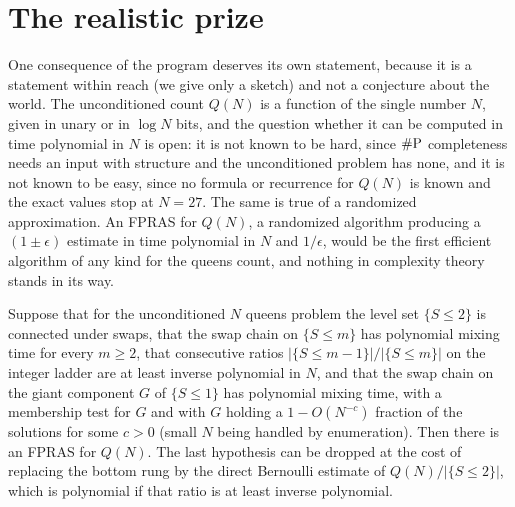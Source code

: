 \section{The realistic prize}

One consequence of the program deserves its own statement, because it is a statement within reach (we give only a sketch) and not a conjecture about the world. The unconditioned count $Q(N)$ is a function of the single number $N$, given in unary or in $\log N$ bits, and the question whether it can be computed in time polynomial in $N$ is open: it is not known to be hard, since $\#\mathrm{P}$ completeness needs an input with structure and the unconditioned problem has none, and it is not known to be easy, since no formula or recurrence for $Q(N)$ is known and the exact values stop at $N = 27$. The same is true of a randomized approximation. An FPRAS for $Q(N)$, a randomized algorithm producing a $(1 \pm \epsilon)$ estimate in time polynomial in $N$ and $1/\epsilon$, would be the first efficient algorithm of any kind for the queens count, and nothing in complexity theory stands in its way.

\begin{proposition}[sketch]
\label{prop:fpras_unconditioned}
Suppose that for the unconditioned $N$ queens problem the level set $\{ S \le 2 \}$ is connected under swaps, that the swap chain on $\{ S \le m \}$ has polynomial mixing time for every $m \ge 2$, that consecutive ratios $|\{ S \le m-1 \}| / |\{ S \le m \}|$ on the integer ladder are at least inverse polynomial in $N$, and that the swap chain on the giant component $G$ of $\{ S \le 1 \}$ has polynomial mixing time, with a membership test for $G$ and with $G$ holding a $1 - O(N^{-c})$ fraction of the solutions for some $c > 0$ (small $N$ being handled by enumeration). Then there is an FPRAS for $Q(N)$. The last hypothesis can be dropped at the cost of replacing the bottom rung by the direct Bernoulli estimate of $Q(N) / |\{ S \le 2 \}|$, which is polynomial if that ratio is at least inverse polynomial.
\end{proposition}

